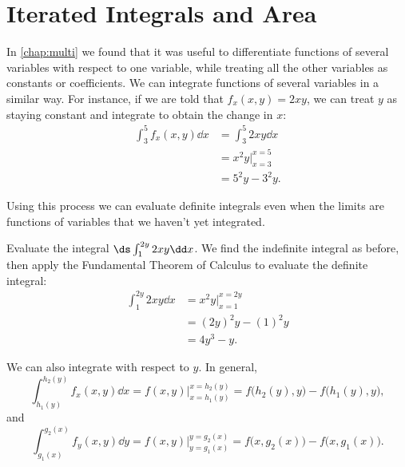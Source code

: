 \section{Iterated Integrals and Area}\label{sec:iterated_integrals}

In \autoref{chap:multi} we found that it was useful to differentiate functions of several variables with respect to one variable, while treating all the other variables as constants or coefficients. We can integrate functions of several variables in a similar way. For instance, if we are told that $f_x(x,y) = 2xy$, we can treat $y$ as staying constant and integrate to obtain the change in $x$: %
\begin{align*}
	\int_3^5 f_x(x,y)\dd x
	&= \int_3^5 2xy\dd x \\
	&= x^2y\Bigr\rvert_{x=3}^{x=5} \\
	&= 5^2y-3^2y. %
\end{align*}

Using this process we can evaluate definite integrals even when the limits are functions of variables that we haven't yet integrated.

\begin{example}\label{ex_iterated1}
Evaluate the integral $\ds \int_1^{2y} 2xy\dd x$.
\solution
We find the indefinite integral as before, then apply the Fundamental Theorem of Calculus to evaluate the definite integral:
\begin{align*}
 \int_1^{2y} 2xy\dd x
 &= x^2y\Big|_{x=1}^{x=2y}\\
 &= (2y)^2y - (1)^2y \\
 &= 4y^3-y.
\end{align*}
\end{example}

We can also integrate with respect to $y$. In general,
\[\int_{h_1(y)}^{h_2(y)} f_x(x,y)\dd x = f(x,y)\Big|_{x=h_1(y)}^{x=h_2(y)} = f\bigl(h_2(y),y\bigr)-f\bigl(h_1(y),y\bigr),\]
and
\[\int_{g_1(x)}^{g_2(x)} f_y(x,y)\dd y = f(x,y)\Big|_{y=g_1(x)}^{y=g_2(x)} = f\bigl(x,g_2(x)\bigr)-f\bigl(x,g_1(x)\bigr).\]


